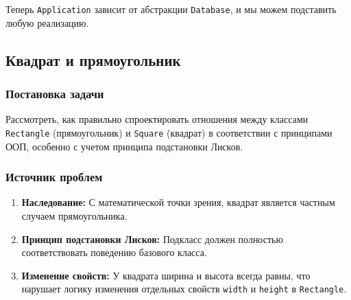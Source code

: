 Теперь \texttt{Application} зависит от абстракции \texttt{Database}, и мы можем подставить любую реализацию.



\subsection{Квадрат и прямоугольник}


\subsubsection{Постановка задачи}

Рассмотреть, как правильно спроектировать отношения между классами \texttt{Rectangle} (прямоугольник) и \texttt{Square} (квадрат) в соответствии с принципами ООП, особенно с учетом принципа подстановки Лисков.

\subsubsection{Источник проблем}
\begin{enumerate}
    \item \textbf{Наследование:} С математической точки зрения, квадрат является частным случаем прямоугольника.
    \item \textbf{Принцип подстановки Лисков:} Подкласс должен полностью соответствовать поведению базового класса.
    \item \textbf{Изменение свойств:} У квадрата ширина и высота всегда равны, что нарушает логику изменения отдельных свойств \texttt{width} и \texttt{height} в \texttt{Rectangle}.
\end{enumerate}

